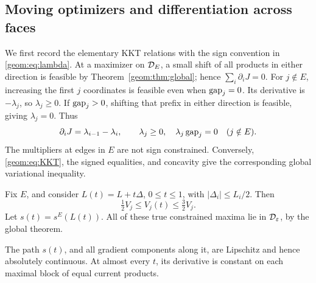 \subsection{Moving optimizers and differentiation across faces}

We first record the elementary KKT relations with the sign convention
in \eqref{geom:eq:lambda}.  At a maximizer on \(\mathcal D_E\), a small shift of
all products in either direction is feasible by
Theorem~\ref{geom:thm:global}; hence \(\sum_i\partial_iJ=0\).
For \(j\notin E\), increasing the first \(j\) coordinates is feasible
even when \(\operatorname{gap}_j=0\).  Its derivative is \(-\lambda_j\), so
\(\lambda_j\ge0\).  If \(\operatorname{gap}_j>0\), shifting that prefix in either
direction is feasible, giving \(\lambda_j=0\).  Thus
\begin{equation}
 \partial_iJ=\lambda_{i-1}-\lambda_i,\qquad
 \lambda_j\ge0,\quad\lambda_j\operatorname{gap}_j=0\quad(j\notin E).
                                                        \label{geom:eq:KKT}
\end{equation}
The multipliers at edges in \(E\) are not sign constrained.
Conversely, \eqref{geom:eq:KKT}, the signed equalities, and concavity
give the corresponding global variational inequality.

Fix \(E\), and consider \(L(t)=L+t\Delta\), \(0\le t\le1\), with
\(|\Delta_i|\le L_i/2\).  Then
\begin{equation}
 \tfrac12 V_j\le V_j(t)\le\tfrac32 V_j.            \label{geom:eq:Vcompare}
\end{equation}
Let \(s(t)=s^E(L(t))\).  All of these true constrained maxima lie in
\(\mathcal D_\varepsilon\), by the global theorem.

\begin{lemma}\label{geom:lem:AC}
The path \(s(t)\), and all gradient components along it, are Lipschitz
and hence absolutely continuous.  At almost every \(t\), its derivative
is constant on each maximal block of equal current products.
\end{lemma}

